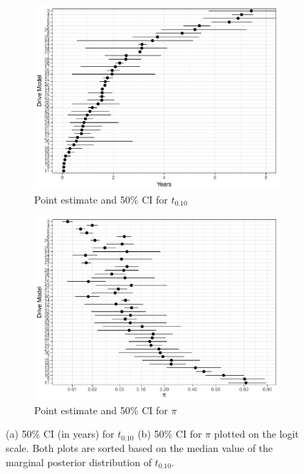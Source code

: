 \documentclass[12pt]{article}
\begin{document}
\begin{figure}[H]
\centering
   \begin{subfigure}[b]{0.80\textwidth}
   \includegraphics[width=1\linewidth]{b10new.pdf}
   \caption{Point estimate and 50\% CI for $t_{0.10}$}
   \label{fig:Ng1} 
\end{subfigure}

\begin{subfigure}[b]{0.80\textwidth}
   \includegraphics[width=1\linewidth]{pinew.pdf}
   \caption{Point estimate and 50\% CI for $\pi$}
   \label{fig:Ng2}
\end{subfigure}

\caption{(a) 50\% CI (in years) for $t_{0.10}$ (b) 50\% CI for $\pi$ plotted on the logit scale.  Both plots are sorted based on the median value of the marginal posterior distribution of $t_{0.10}$.}
\end{figure}
\end{document}
